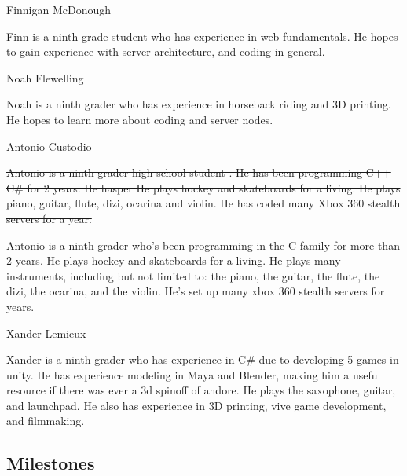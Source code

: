 \documentclass[11pt]{article}
\begin{document}
{\large {\color{orange}Finnigan McDonough}}

Finn is a ninth grade student who has experience in web fundamentals. He hopes to gain experience with server architecture, and coding in general.

{\large {\color{orange}Noah Flewelling}}

Noah is a ninth grader who has experience in horseback riding and 3D printing. He hopes to learn more about coding and server nodes.

{\large {\color{orange} Antonio Custodio}}

\sout{
Antonio is a ninth grader high school student . He has been programming C++  C\# for 2 years. He hasper  He plays hockey  and skateboards for a living.  He plays piano, guitar, flute, dizi, ocarina and violin. He has coded many Xbox 360 stealth servers for a year.
}

Antonio is a ninth grader who's been programming in the C family for more than 2 years. He plays hockey and skateboards for a living. He plays many instruments, including but not limited to: the piano, the guitar, the flute, the dizi, the ocarina, and the violin. He’s set up many xbox 360 stealth servers for years.


{\large {\color{orange} Xander Lemieux}}

Xander is a ninth grader who has experience in C\# due to developing 5 games in unity. He has experience modeling in Maya and Blender, making him a useful resource if there was ever a 3d spinoff of andore. He plays the saxophone, guitar, and launchpad. He also has experience in 3D printing, vive game development, and filmmaking. 

\subsection{{\color{blue}Milestones}}
\end{document}
